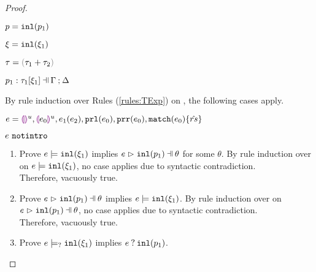 \begin{proof}
\begin{byCases}
    \begin{pfsteps*}
    \item $p=\mathtt{inl}(p_1)$ 
    \item $\xi=\mathtt{inl}(\xi_1)$ 
    \item $\tau=\tsum{\tau_1}{\tau_2}$ 
    \item $\chpattyp{p_1}{\tau_1}{\xi_1}{\Gamma}{\Delta}$  
    \end{pfsteps*}
    By rule induction over Rules (\ref{rules:TExp}) on , the following cases apply.
    \begin{byCases}
    \item[\text{(\ref{rule:TEHole}),(\ref{rule:THole}),(\ref{rule:TAp}),(\ref{rule:TPrl}),(\ref{rule:TPrr}),(\ref{rule:TMatchZPre}),(\ref{rule:TMatchNZPre})}]
        \begin{pfsteps*}
        \item $e=\textcolor{violet}{\llparenthesis}\textcolor{violet}{\rrparenthesis}^{u},\textcolor{violet}{\llparenthesis} e_0\textcolor{violet}{\rrparenthesis}^{u},e_1(e_2),\mathtt{prl}(e_0),\mathtt{prr}(e_0),\mathtt{match}(e_0) \{\hat{rs}\}$ 
        \item $e ~\mathtt{notintro}$  
        \end{pfsteps*}
        \begin{enumerate}
        \item Prove $e \models \mathtt{inl}(\xi_1)$ implies $\hpatmatch{e}{\hinlp{p_1}}{\theta}$ for some $\theta$.
        By rule induction over  on $e \models \mathtt{inl}(\xi_1)$, no case applies due to syntactic contradiction. \\ Therefore, vacuously true.
        \item Prove $\hpatmatch{e}{\hinlp{p_1}}{\theta}$ implies $e \models \mathtt{inl}(\xi_1)$.
        By rule induction over  on $\hpatmatch{e}{\hinlp{p_1}}{\theta}$, no case applies due to syntactic contradiction. \\ Therefore, vacuously true.
        \item Prove $e \models_{?} \mathtt{inl}(\xi_1)$ implies $e \mathbin{?} \mathtt{inl}(p_1)$.
\end{enumerate}
\end{byCases}
\end{byCases}
\end{proof}
